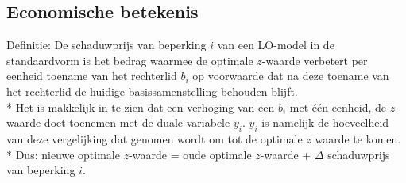 \documentclass[10pt]{article}
\begin{document}
\subsection{Economische betekenis}
\label{sec:Schaduwprijs}
Definitie: De schaduwprijs van beperking $i$ van een LO-model in de standaardvorm is het bedrag waarmee de optimale $z$-waarde verbetert per eenheid toename van het rechterlid $b_i$ op voorwaarde dat na deze toename van het rechterlid de huidige basissamenstelling behouden blijft.\\*
Het is makkelijk in te zien dat een verhoging van een $b_i$ met \'e\'en eenheid, de $z$-waarde doet toenemen met de duale variabele $y_i$. $y_i$ is namelijk de hoeveelheid van deze vergelijking dat genomen wordt om tot de optimale $z$ waarde te komen.\\*
Dus: nieuwe optimale $z$-waarde = oude optimale $z$-waarde + $\Delta$ schaduwprijs van beperking $i$.
\end{document}
